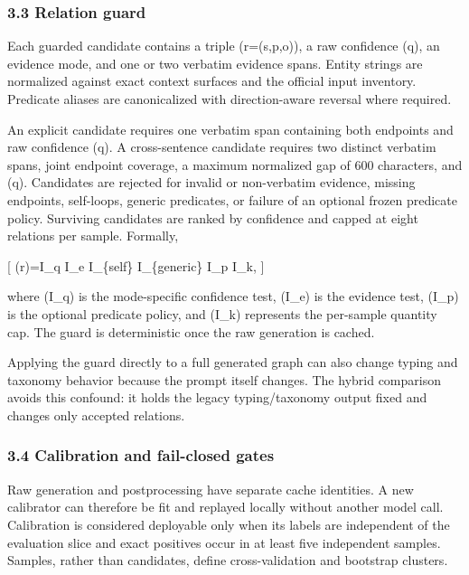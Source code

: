 \documentclass[
]{article}
\begin{document}
\subsubsection{3.3 Relation guard}\label{relation-guard}

Each guarded candidate contains a triple (r=(s,p,o)), a raw confidence
(q\in[0,1]), an evidence mode, and one or two verbatim evidence spans.
Entity strings are normalized against exact context surfaces and the
official input inventory. Predicate aliases are canonicalized with
direction-aware reversal where required.

An explicit candidate requires one verbatim span containing both
endpoints and raw confidence (q). A cross-sentence candidate
requires two distinct verbatim spans, joint endpoint coverage, a maximum
normalized gap of 600 characters, and (q). Candidates are
rejected for invalid or non-verbatim evidence, missing endpoints,
self-loops, generic predicates, or failure of an optional frozen
predicate policy. Surviving candidates are ranked by confidence and
capped at eight relations per sample. Formally,

{[} (r)=I\_q I\_e I\_\{\neg self\}
I\_\{\neg generic\} I\_p I\_k, {]}

where (I\_q) is the mode-specific confidence test, (I\_e) is the
evidence test, (I\_p) is the optional predicate policy, and (I\_k)
represents the per-sample quantity cap. The guard is deterministic once
the raw generation is cached.

Applying the guard directly to a full generated graph can also change
typing and taxonomy behavior because the prompt itself changes. The
hybrid comparison avoids this confound: it holds the legacy
typing/taxonomy output fixed and changes only accepted relations.

\subsubsection{3.4 Calibration and fail-closed
gates}\label{calibration-and-fail-closed-gates}

Raw generation and postprocessing have separate cache identities. A new
calibrator can therefore be fit and replayed locally without another
model call. Calibration is considered deployable only when its labels
are independent of the evaluation slice and exact positives occur in at
least five independent samples. Samples, rather than candidates, define
cross-validation and bootstrap clusters.
\end{document}
